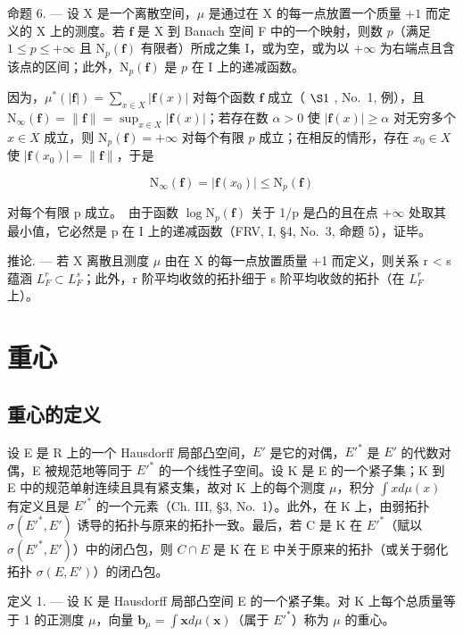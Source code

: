 命题 6. --- 设 X 是一个离散空间，\(\mu\) 是通过在 X 的每一点放置一个质量 \(+1\) 而定义的 X 上的测度。若 \(\mathbf{f}\) 是 X 到 Banach 空间 F 中的一个映射，则数 \(p\)（满足 \(1 \leqslant p \leqslant +\infty\) 且 \(\mathrm{N}_p(\mathbf{f})\) 有限者）所成之集 I，或为空，或为以 \(+\infty\) 为右端点且含该点的区间；此外，\(\mathrm{N}_p(\mathbf{f})\) 是 \(p\) 在 I 上的递减函数。

因为，\(\mu^{*}(|\mathbf{f}|) = \sum_{x\in X}|\mathbf{f}(x)|\) 对每个函数 \(\mathbf{f}\) 成立（ \(\S 1\) , No.~1, 例），且 \(\mathrm{N}_{\infty}(\mathbf{f}) = \| \mathbf{f}\| = \sup_{x\in X}|\mathbf{f}(x)|\)；若存在数 \(\alpha >0\) 使 \(|\mathbf{f}(x)|\geqslant \alpha\) 对无穷多个 \(x\in X\) 成立，则 \(\mathrm{N}_p(\mathbf{f}) = +\infty\) 对每个有限 \(p\) 成立；在相反的情形，存在 \(x_0\in X\) 使 \(|\mathbf{f}(x_0)| = \| \mathbf{f}\|\)，于是

\[
\mathrm{N} _ {\infty} (\mathbf {f}) = | \mathbf {f} (x _ {0}) | \leqslant \mathrm{N} _ {p} (\mathbf {f})
\]

对每个有限 p 成立。~由于函数 \(\log\mathrm{N}_{p}(\mathbf{f})\) 关于 1/p 是凸的且在点 \(+\infty\) 处取其最小值，它必然是 p 在 I 上的递减函数（FRV, I, §4, No.~3, 命题 5），证毕。

推论. --- 若 X 离散且测度 \(\mu\) 由在 X 的每一点放置质量 +1 而定义，则关系 r < s 蕴涵 \(L_{F}^{r} \subset L_{F}^{s}\)；此外，r 阶平均收敛的拓扑细于 s 阶平均收敛的拓扑（在 \(L_{F}^{r}\) 上）。

\section{重心}

\subsection{重心的定义}

设 E 是 R 上的一个 Hausdorff 局部凸空间，\(E'\) 是它的对偶，\(E'^{*}\) 是 \(E'\) 的代数对偶，E 被规范地等同于 \(E'^{*}\) 的一个线性子空间。设 K 是 E 的一个紧子集；K 到 E 中的规范单射连续且具有紧支集，故对 K 上的每个测度 \(\mu\)，积分 \(\int x d\mu(x)\) 有定义且是 \(E'^{*}\) 的一个元素（Ch. III, §3, No.~1）。此外，在 K 上，由弱拓扑 \(\sigma(E'^{*}, E')\) 诱导的拓扑与原来的拓扑一致。最后，若 C 是 K 在 \(E'^{*}\)（赋以 \(\sigma(E'^{*}, E')\)）中的闭凸包，则 \(C \cap E\) 是 K 在 E 中关于原来的拓扑（或关于弱化拓扑 \(\sigma(E, E')\)）的闭凸包。

定义 1. --- 设 K 是 Hausdorff 局部凸空间 E 的一个紧子集。对 K 上每个总质量等于 1 的正测度 \(\mu\)，向量 \(\mathbf{b}_{\mu} = \int \mathbf{x} d\mu(\mathbf{x})\)（属于 \(E'^{*}\)）称为 \(\mu\) 的重心。

